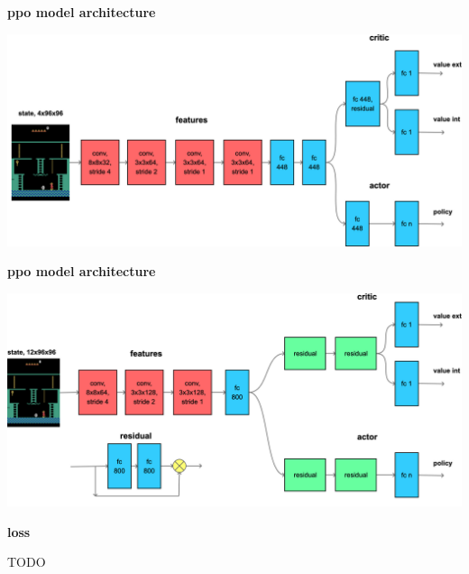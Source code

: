 \documentclass[xcolor=dvipsnames]{beamer}
\begin{document}
\begin{frame}{\bf ppo model architecture}

\centering
\includegraphics[scale=0.12]{../diagrams/rnd/modelppoa.png}

\end{frame}

\begin{frame}{\bf ppo model architecture}

\centering
\includegraphics[scale=0.1]{../diagrams/rnd/modelppob.png}

\end{frame}


\begin{frame}{\bf loss}

TODO 

\end{frame}
\end{document}
